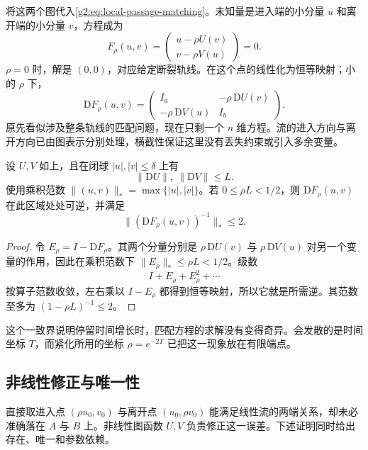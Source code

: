 \ProseParagraphBreak

将这两个图代入\eqref{g2:eq:local-passage-matching}。未知量是进入端的小分量 \(u\) 和离开端的小分量 \(v\)，方程成为
\begin{equation}\label{g2:eq:gluing-finite-equation}
	F_\rho(u,v)=
	\begin{pmatrix}
		u-\rho U(v)\\
		v-\rho V(u)
	\end{pmatrix}=0.
\end{equation}
\(\rho=0\) 时，解是 \((0,0)\)，对应给定断裂轨线。在这个点的线性化为恒等映射；小的 \(\rho\) 下，
\[
	\mathrm DF_\rho(u,v)=
	\begin{pmatrix}
		I_a&-\rho\,\mathrm DU(v)\\
		-\rho\,\mathrm DV(u)&I_b
	\end{pmatrix}.
\]
原先看似涉及整条轨线的匹配问题，现在只剩一个 \(n\) 维方程。流的进入方向与离开方向已由图表示分别处理，横截性保证这里没有丢失约束或引入多余变量。

\begin{lemma}\label{g2:lem:gluing-uniform-inverse}
	设 \(U,V\) 如上，且在闭球 \(|u|,|v|\le\delta\) 上有
	\[
		\|\mathrm DU\|,\ \|\mathrm DV\|\le L.
	\]
	使用乘积范数 \(\|(u,v)\|_*=\max\{|u|,|v|\}\)。若 \(0\le\rho L<1/2\)，则 \(\mathrm DF_\rho(u,v)\) 在此区域处处可逆，并满足
	\[
		\|(\mathrm DF_\rho(u,v))^{-1}\|_*\le2.
	\]
\end{lemma}
\begin{proof}
	令 \(E_\rho=I-\mathrm DF_\rho\)。其两个分量分别是 \(\rho\,\mathrm DU(v)\) 与 \(\rho\,\mathrm DV(u)\) 对另一个变量的作用，因此在乘积范数下 \(\|E_\rho\|_*\le\rho L<1/2\)。级数
	\[
		I+E_\rho+E_\rho^2+\cdots
	\]
	按算子范数收敛，左右乘以 \(I-E_\rho\) 都得到恒等映射，所以它就是所需逆。其范数至多为 \((1-\rho L)^{-1}\le2\)。
\end{proof}

这个一致界说明停留时间增长时，匹配方程的求解没有变得奇异。会发散的是时间坐标 \(T\)，而紧化所用的坐标 \(\rho=e^{-2T}\) 已把这一现象放在有限端点。

\subsection{非线性修正与唯一性}
\label{g2:subsec:1803:03}

直接取进入点 \((\rho u_0,v_0)\) 与离开点 \((u_0,\rho v_0)\) 能满足线性流的两端关系，却未必准确落在 \(A\) 与 \(B\) 上。非线性图函数 \(U,V\) 负责修正这一误差。下述证明同时给出存在、唯一和参数依赖。

